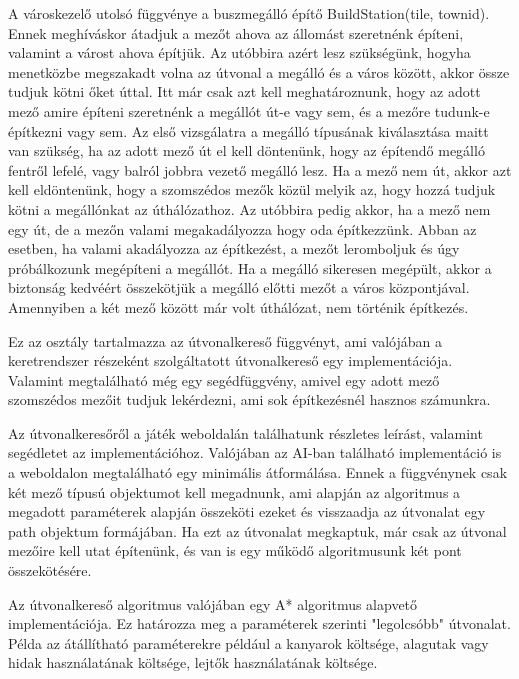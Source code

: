 A városkezelő utolsó függvénye a buszmegálló építő BuildStation(tile, townid). Ennek meghíváskor átadjuk a mezőt ahova az állomást szeretnénk építeni, valamint a várost ahova építjük. Az utóbbira azért lesz szükségünk, hogyha menetközbe megszakadt volna az útvonal a megálló és a város között, akkor össze tudjuk kötni őket úttal. Itt már csak azt kell meghatároznunk, hogy az adott mező amire építeni szeretnénk a megállót út-e vagy sem, és a mezőre tudunk-e építkezni vagy sem. Az első vizsgálatra a megálló típusának kiválasztása maitt van szükség, ha az adott mező út el kell döntenünk, hogy az építendő megálló fentről lefelé, vagy balról jobbra vezető megálló lesz. Ha a mező nem út, akkor azt kell eldöntenünk, hogy a szomszédos mezők közül melyik az, hogy hozzá tudjuk kötni a megállónkat az úthálózathoz. Az utóbbira pedig akkor, ha a mező nem egy út, de a mezőn valami megakadályozza hogy oda építkezzünk. Abban az esetben, ha valami akadályozza az építkezést, a mezőt leromboljuk és úgy próbálkozunk megépíteni a megállót. Ha a megálló sikeresen megépült, akkor a biztonság kedvéért összekötjük a megálló előtti mezőt a város központjával. Amennyiben a két mező között már volt úthálózat, nem történik építkezés.


Ez az osztály tartalmazza az útvonalkereső függvényt, ami valójában a keretrendszer részeként szolgáltatott útvonalkereső egy implementációja. Valamint megtalálható még egy segédfüggvény, amivel egy adott mező szomszédos mezőit tudjuk lekérdezni, ami sok építkezésnél hasznos számunkra.

Az útvonalkeresőről a játék weboldalán találhatunk részletes leírást, valamint segédletet az implementációhoz. Valójában az AI-ban található implementáció is a weboldalon megtalálható egy minimális átformálása. Ennek a függvénynek csak két mező típusú objektumot kell megadnunk, ami alapján az algoritmus a megadott paraméterek alapján összeköti ezeket és visszaadja az útvonalat egy path objektum formájában. Ha ezt az útvonalat megkaptuk, már csak az útvonal mezőire kell utat építenünk, és van is egy működő algoritmusunk két pont összekötésére.

Az útvonalkereső algoritmus valójában egy A* algoritmus alapvető implementációja. Ez határozza meg a paraméterek szerinti "legolcsóbb" útvonalat. Példa az átállítható paraméterekre például a kanyarok költsége, alagutak vagy hidak használatának költsége, lejtők használatának költsége.


